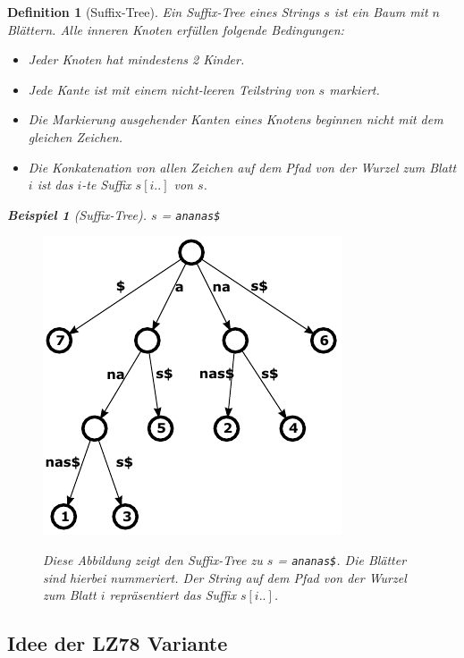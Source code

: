 \documentclass[a4paper,11pt]{scrartcl}%
\theoremstyle{nonumberplain}
\theoremstyle{change}
\newtheorem{definition}[theorem]{Definition}
\theoremstyle{nonumberplain}
\theoremstyle{change}
\newtheorem{beispiel}[theorem]{Beispiel}
\theoremstyle{nonumberplain}
\begin{document}
	\begin{definition}[Suffix-Tree]
		Ein Suffix-Tree eines Strings $s$ ist ein Baum mit $n$ Blättern. Alle inneren Knoten erfüllen folgende Bedingungen:
		\begin{itemize}
			\item Jeder Knoten hat mindestens 2 Kinder.
			\item Jede Kante ist mit einem nicht-leeren Teilstring von $s$ markiert.
			\item Die Markierung ausgehender Kanten eines Knotens beginnen nicht mit dem gleichen Zeichen.
			\item Die Konkatenation von allen Zeichen auf dem Pfad von der Wurzel zum Blatt $i$ ist das $i$-te Suffix $s[i..]$ von $s$.
		\end{itemize}
		\begin{beispiel}[Suffix-Tree]
			$s$ = \texttt{ananas\$}
			\begin{figure}
				\centering
				  \includegraphics[scale=0.8]{./ananas_suffixTree}
				  \cite{suffixtreeurl}
				  \caption{Diese Abbildung zeigt den Suffix-Tree zu $s$ = \texttt{ananas\$}. Die Blätter sind hierbei nummeriert. Der String auf dem Pfad von der Wurzel zum Blatt $i$ repräsentiert das Suffix $s[i..]$. }
			\end{figure}
		\end{beispiel}
		
	\end{definition}
	\newpage
	\subsection{Idee der LZ78 Variante}
\end{document}
